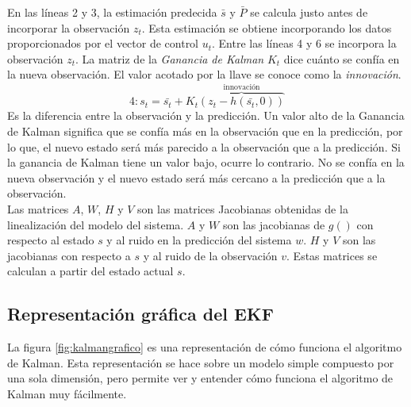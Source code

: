 En las líneas 2 y 3, la estimación predecida $\bar{s}$ y $\bar{P}$ se calcula justo antes de incorporar la observación $z_t$. Esta estimación se obtiene incorporando los datos proporcionados por el vector de control $u_t$. Entre las líneas 4 y 6 se incorpora la observación $z_t$. La matriz de la \textit{Ganancia de Kalman} $K_t$ dice cuánto se confía en la nueva observación. El valor acotado por la llave se conoce como la \textit{innovación}.
\begin{equation}
4: s_t = \bar{s_t} + K_t \overbrace{( z_t - h( \bar{s_t}, 0 ) )}^\text{innovación}
\end{equation}
Es la diferencia entre la observación y la predicción. Un valor alto de la Ganancia de Kalman significa que se confía más en la observación que en la predicción, por lo que, el nuevo estado será más parecido a la observación que a la predicción. Si la ganancia de Kalman tiene un valor bajo, ocurre lo contrario. No se confía en la nueva observación y el nuevo estado será más cercano a la predicción que a la observación.\\

Las matrices $A$, $W$, $H$ y $V$ son las matrices Jacobianas obtenidas de la linealización del modelo del sistema. $A$ y $W$ son las jacobianas de $g()$ con respecto al estado $s$ y al ruido en la predicción del sistema $w$. $H$ y $V$ son las jacobianas con respecto a $s$ y al ruido de la observación $v$. Estas matrices se calculan a partir del estado actual $s$.

\subsection{Representación gráfica del EKF}
\label{subsec:representaciondelekf}

La figura \ref{fig:kalmangrafico} es una representación de cómo funciona el algoritmo de Kalman. Esta representación se hace sobre un modelo simple compuesto por una sola dimensión, pero permite ver y entender cómo funciona el algoritmo de Kalman muy fácilmente. \\

